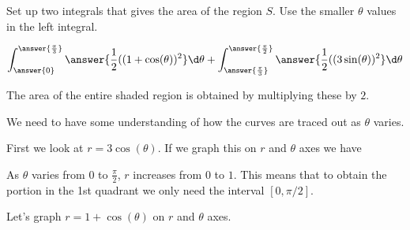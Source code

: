 \documentclass{ximera}
\begin{document}
\begin{exercise}
\begin{multipleChoice}
\end{multipleChoice}


\begin{exercise}

Set up two integrals that gives the area of the region $S$. Use the smaller $\theta$ values in the left integral. 


\[
\int_{\answer{0}}^{\answer{ \frac{\pi}{3} } } \answer{ \frac{1}{2}((1+\cos(\theta))^2   } \d \theta +  \int_{\answer{\frac{\pi}{3}}}^{\answer{\frac{\pi}{2}}} \answer{ \frac{1}{2} ( (3\sin(\theta))^2 } \d \theta
\]

The area of the entire shaded region is obtained by multiplying these by $2$. 


\begin{hint}








We need to have some understanding of how the curves are traced out as $\theta$ varies. 

First we look at $r=3\cos(\theta)$. If we graph this on $r$ and $\theta$ axes we have


\begin{image}  
\end{image} 


As $\theta$ varies from $0$ to $\frac{\pi}{2}$, $r$ increases from $0$ to $1$. This means that to obtain the portion in the 1st quadrant we only need the interval $[0, \pi/2]$. 


Let's graph $r=1+\cos(\theta)$ on $r$ and $\theta$ axes. 


\end{hint}
\end{exercise}
\end{exercise}
\end{document}
